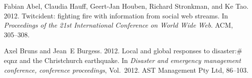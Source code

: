 \begin{thebibliography}{5}
	
	
	\ifx \showCODEN    \undefined {}     \fi
	\ifx \showDOI      \undefined \def \showDOI       #1{#1}\fi
	\ifx \showISBNx    \undefined \def \showISBNx     #1{\unskip}     \fi
	\ifx \showISBNxiii \undefined \def \showISBNxiii  #1{\unskip}     \fi
	\ifx \showISSN     \undefined \def \showISSN      #1{\unskip}     \fi
	\ifx \showLCCN     \undefined \def \showLCCN      #1{\unskip}     \fi
	\ifx \shownote     \undefined \def \shownote      #1{#1}          \fi
	\ifx \showarticletitle \undefined \def \showarticletitle #1{#1}   \fi
	\ifx \showURL      \undefined \def \showURL       {\relax}        \fi
	\providecommand\bibfield[2]{#2}
	\providecommand\bibinfo[2]{#2}
	\providecommand\natexlab[1]{#1}
	\providecommand\showeprint[2][]{arXiv:#2}
	
	\bibfield{author}{\bibinfo{person}{Fabian Abel}, \bibinfo{person}{Claudia
			Hauff}, \bibinfo{person}{Geert-Jan Houben}, \bibinfo{person}{Richard
			Stronkman}, {and} \bibinfo{person}{Ke Tao}.} \bibinfo{year}{2012}\natexlab{}.
	\newblock \showarticletitle{Twitcident: fighting fire with information from
		social web streams}. In \bibinfo{booktitle}{\emph{Proceedings of the 21st
			International Conference on World Wide Web}}. ACM, \bibinfo{pages}{305--308}.
	
	\bibfield{author}{\bibinfo{person}{Axel Bruns} {and} \bibinfo{person}{Jean~E
			Burgess}.} \bibinfo{year}{2012}\natexlab{}.
	\newblock \showarticletitle{Local and global responses to disaster:\# eqnz and
		the Christchurch earthquake}. In \bibinfo{booktitle}{\emph{Disaster and
			emergency management conference, conference proceedings}},
	Vol.~\bibinfo{volume}{2012}. AST Management Pty Ltd,
	\bibinfo{pages}{86--103}.
	

\end{thebibliography}
